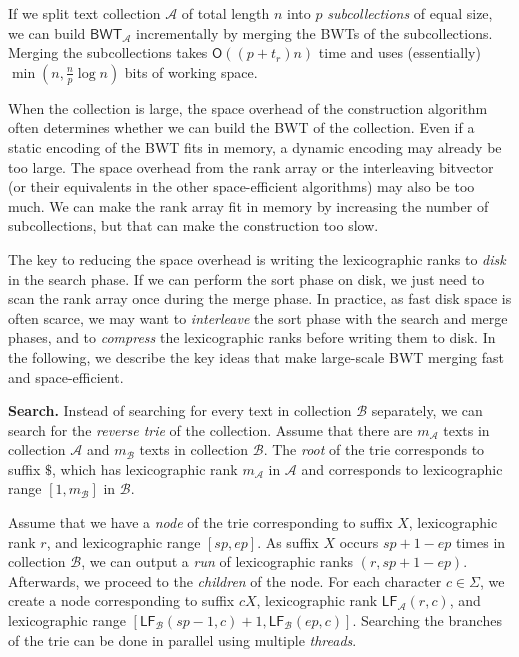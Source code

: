 \documentclass[smallabstract,smallcaptions]{dccpaper}
\newcommand{\Oh}{\ensuremath{\mathsf{O}}}
\newcommand{\BWT}{\textsf{BWT}}
\newcommand{\mBWT}{\ensuremath{\mathsf{BWT}}}
\newcommand{\mLF}{\ensuremath{\mathsf{LF}}}
\newcommand{\Acoll}{\ensuremath{\mathcal{A}}}
\newcommand{\Bcoll}{\ensuremath{\mathcal{B}}}
\begin{document}
\Section{Large-scale \BWT{} merging}

If we split text collection $\Acoll$ of total length $n$ into $p$ \emph{subcollections} of equal size, we can build $\mBWT_{\Acoll}$ incrementally by merging the \BWT{}s of the subcollections. Merging the subcollections takes $\Oh((p+t_{r})n)$ time and uses (essentially) $\min(n, \frac{n}{p} \log n)$ bits of working space.

When the collection is large, the space overhead of the construction algorithm often determines whether we can build the \BWT{} of the collection. Even if a static encoding of the \BWT{} fits in memory, a dynamic encoding may already be too large. The space overhead from the rank array or the interleaving bitvector (or their equivalents in the other space-efficient algorithms) may also be too much. We can make the rank array fit in memory by increasing the number of subcollections, but that can make the construction too slow.

The key to reducing the space overhead is writing the lexicographic ranks to \emph{disk} in the search phase. If we can perform the sort phase on disk, we just need to scan the rank array once during the merge phase. In practice, as fast disk space is often scarce, we may want to \emph{interleave} the sort phase with the search and merge phases, and to \emph{compress} the lexicographic ranks before writing them to disk. In the following, we describe the key ideas that make large-scale \BWT{} merging fast and space-efficient.

\smallbreak\noindent\textbf{Search.} Instead of searching for every text in collection $\Bcoll$ separately, we can search for the \emph{reverse trie} of the collection. Assume that there are $m_{\Acoll}$ texts in collection $\Acoll$ and $m_{\Bcoll}$ texts in collection $\Bcoll$. The \emph{root} of the trie corresponds to suffix $\$$, which has lexicographic rank $m_{\Acoll}$ in $\Acoll$ and corresponds to lexicographic range $[1,m_{\Bcoll}]$ in $\Bcoll$.

Assume that we have a \emph{node} of the trie corresponding to suffix $X$, lexicographic rank $r$, and lexicographic range $[sp,ep]$. As suffix $X$ occurs $sp+1-ep$ times in collection $\Bcoll$, we can output a \emph{run} of lexicographic ranks $(r, sp+1-ep)$. Afterwards, we proceed to the \emph{children} of the node. For each character $c \in \Sigma$, we create a node corresponding to suffix $cX$, lexicographic rank $\mLF_{\Acoll}(r,c)$, and lexicographic range $[\mLF_{\Bcoll}(sp-1, c) + 1, \mLF_{\Bcoll}(ep, c)]$. Searching the branches of the trie can be done in parallel using multiple \emph{threads}.
\end{document}
